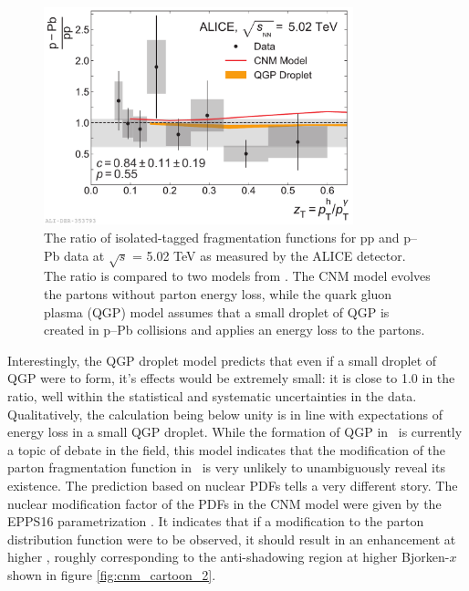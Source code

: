 \begin{figure}[htpb]
  \centering
  \includegraphics[width=0.8\textwidth]{FF_Model_Comparisons_Ratio.pdf}
  \caption{The ratio of isolated-tagged fragmentation functions for pp and p–Pb data at $\sqrt{s}$ = 5.02 TeV as measured by the ALICE detector.  The ratio is compared to two models from \cite{Xie2021}. The CNM model evolves the partons without parton energy loss, while the quark gluon plasma (QGP) model assumes that a small droplet of QGP is created in p–Pb collisions and applies an energy loss to the partons.}
  \label{fig:FF_model}
\end{figure}
Interestingly, the QGP droplet model predicts that even if a small droplet of QGP were to form, it's effects would be extremely small: it is close to 1.0 in the ratio, well within the statistical and systematic uncertainties in the data. Qualitatively, the calculation being below unity is in line with expectations of energy loss in a small QGP droplet. While the formation of QGP in \pPb~is currently a topic of debate in the field, this model indicates that the modification of the parton fragmentation function in \pPb~is very unlikely to unambiguously reveal its existence. The prediction based on nuclear PDFs tells a very different story. The nuclear modification factor of the PDFs in the CNM model were given by the EPPS16 parametrization \cite{Eskola2017a}. It indicates that if a modification to the parton distribution function were to be observed, it should result in an enhancement at higher \zt, roughly corresponding to the anti-shadowing region at higher Bjorken-$x$ shown in figure \ref{fig:cnm_cartoon_2}. 

